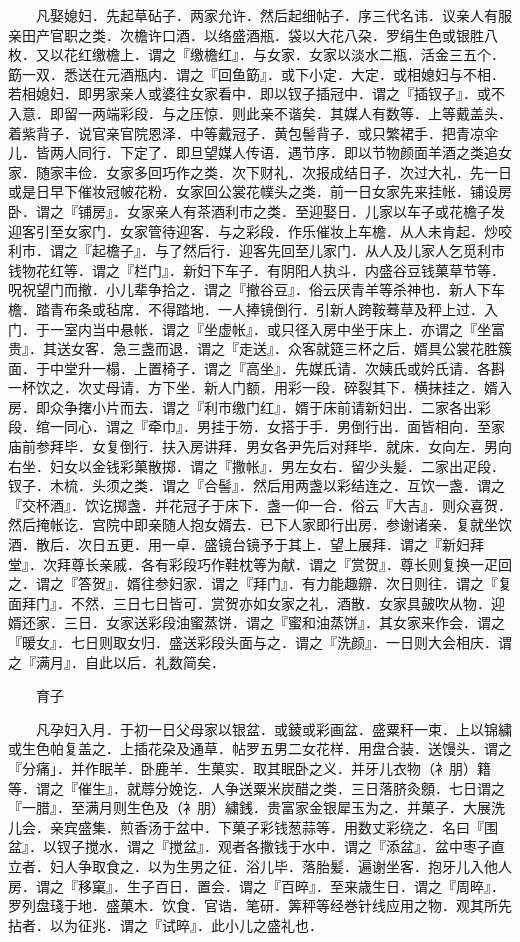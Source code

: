 　　凡娶媳妇．先起草砧子．两家允许．然后起细帖子．序三代名讳．议亲人有服亲田产官职之类．次檐许口酒．以络盛酒瓶．袋以大花八朶．罗绢生色或银胜八枚．又以花红缴檐上．谓之『缴檐红』．与女家．女家以淡水二瓶．活金三五个．筯一双．悉送在元酒瓶内．谓之『回鱼筯』．或下小定．大定．或相媳妇与不相．若相媳妇．即男家亲人或婆往女家看中．即以钗子插冠中．谓之『插钗子』．或不入意．即留一两端彩段．与之压惊．则此亲不谐矣．其媒人有数等．上等戴盖头．着紫背子．说官亲官院恩泽．中等戴冠子．黄包髻背子．或只繁裙手．把青凉伞儿．皆两人同行．下定了．即旦望媒人传语．遇节序．即以节物颜面羊酒之类追女家．随家丰俭．女家多回巧作之类．次下财礼．次报成结日子．次过大礼．先一日或是日早下催妆冠帔花粉．女家回公裳花幞头之类．前一日女家先来挂帐．铺设房卧．谓之『铺房』．女家亲人有茶酒利市之类．至迎娶日．儿家以车子或花檐子发迎客引至女家门．女家管待迎客．与之彩段．作乐催妆上车檐．从人未肯起．炒咬利市．谓之『起檐子』．与了然后行．迎客先回至儿家门．从人及儿家人乞觅利市钱物花红等．谓之『栏门』．新妇下车子．有阴阳人执斗．内盛谷豆钱菓草节等．呪祝望门而撤．小儿辈争拾之．谓之『撤谷豆』．俗云厌青羊等杀神也．新人下车檐．踏青布条或毡席．不得踏地．一人捧镜倒行．引新人跨鞍蓦草及秤上过．入门．于一室内当中悬帐．谓之『坐虚帐』．或只径入房中坐于床上．亦谓之『坐富贵』．其送女客．急三盏而退．谓之『走送』．众客就筵三杯之后．婿具公裳花胜簇面．于中堂升一榻．上置椅子．谓之『高坐』．先媒氏请．次姨氏或妗氏请．各斟一杯饮之．次丈母请．方下坐．新人门额．用彩一段．碎裂其下．横抹挂之．婿入房．即众争撦小片而去．谓之『利市缴门红』．婿于床前请新妇出．二家各出彩段．绾一同心．谓之『牵巾』．男挂于笏．女搭于手．男倒行出．面皆相向．至家庙前参拜毕．女复倒行．扶入房讲拜．男女各尹先后对拜毕．就床．女向左．男向右坐．妇女以金钱彩菓散掷．谓之『撒帐』．男左女右．留少头髪．二家出疋段．钗子．木梳．头须之类．谓之『合髻』．然后用两盏以彩结连之．互饮一盏．谓之『交杯酒』．饮讫掷盏．并花冠子于床下．盏一仰一合．俗云『大吉』．则众喜贺．然后掩帐讫．宫院中即亲随人抱女婿去．已下人家即行出房．参谢诸亲．复就坐饮酒．散后．次日五更．用一卓．盛镜台镜予于其上．望上展拜．谓之『新妇拜堂』．次拜尊长亲戚．各有彩段巧作鞋枕等为献．谓之『赏贺』．尊长则复换一疋回之．谓之『答贺』．婿往参妇家．谓之『拜门』．有力能趣辧．次日则往．谓之『复面拜门』．不然．三日七日皆可．赏贺亦如女家之礼．酒散．女家具皷吹从物．迎婿还家．三日．女家送彩段油蜜蒸饼．谓之『蜜和油蒸饼』．其女家来作会．谓之『暖女』．七日则取女归．盛送彩段头面与之．谓之『洗颜』．一日则大会相庆．谓之『满月』．自此以后．礼数简矣．

　　育子

　　凡孕妇入月．于初一日父母家以银盆．或錂或彩画盆．盛粟秆一束．上以锦繍或生色帕复盖之．上插花朶及通草．帖罗五男二女花样．用盘合装．送馒头．谓之『分痛」．并作眠羊．卧鹿羊．生菓实．取其眠卧之义．并牙儿衣物（衤朋）籍等．谓之『催生』．就蓐分娩讫．人争送粟米炭醋之类．三日落脐灸顖．七日谓之『一腊』．至满月则生色及（衤朋）繍銭．贵富家金银犀玉为之．并菓子．大展洗儿会．亲宾盛集．煎香汤于盆中．下菓子彩钱葱蒜等．用数丈彩绕之．名曰『围盆』．以钗子搅水．谓之『搅盆』．观者各撒钱于水中．谓之『添盆』．盆中枣子直立者．妇人争取食之．以为生男之征．浴儿毕．落胎髪．遍谢坐客．抱牙儿入他人房．谓之『移窠』．生子百日．置会．谓之『百晬』．至来歳生日．谓之『周晬』．罗列盘琖于地．盛菓木．饮食．官诰．笔研．筭秤等经巻针线应用之物．观其所先拈者．以为征兆．谓之『试晬』．此小儿之盛礼也．


